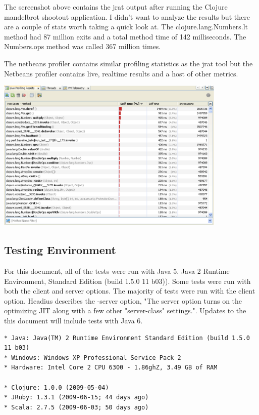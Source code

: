 The screenshot above contains the jrat output after running the Clojure mandelbrot shootout application. I didn't want to analyze the results but there are a couple of stats worth taking a quick look at. The clojure.lang.Numbers.lt method had 87 million exits and a total method time of 142 milliseconds. The Numbers.ops method was called 367 million times.

The netbeans profiler contains similar profiling statistics as the jrat tool but the Netbeans profiler contains live, realtime results and a host of other metrics.

\includegraphics[width=110mm]{netbeans_profile1_40.eps}

\subsection{Testing Environment}

For this document, all of the tests were run with Java 5. Java 2 Runtime Environment, Standard Edition (build 1.5.0 11 b03)). Some tests were run with both the client and server options. The majority of tests were run with the client option. Headius describes the -server option, "The server option turns on the optimizing JIT along with a few other "server-class" settings.". Updates to the this document will include tests with Java 6.
\begin{verbatim}
* Java: Java(TM) 2 Runtime Environment Standard Edition (build 1.5.0 11 b03)
* Windows: Windows XP Professional Service Pack 2
* Hardware: Intel Core 2 CPU 6300 - 1.86ghZ, 3.49 GB of RAM

* Clojure: 1.0.0 (2009-05-04)
* JRuby: 1.3.1 (2009-06-15; 44 days ago)
* Scala: 2.7.5 (2009-06-03; 50 days ago)
\end{verbatim}
